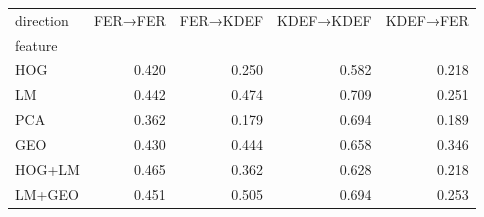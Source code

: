 \begin{tabular}{lrrrr}
\toprule
direction & FER→FER & FER→KDEF & KDEF→KDEF & KDEF→FER \\
feature &  &  &  &  \\
\midrule
HOG & 0.420 & 0.250 & 0.582 & 0.218 \\
LM & 0.442 & 0.474 & 0.709 & 0.251 \\
PCA & 0.362 & 0.179 & 0.694 & 0.189 \\
GEO & 0.430 & 0.444 & 0.658 & 0.346 \\
HOG+LM & 0.465 & 0.362 & 0.628 & 0.218 \\
LM+GEO & 0.451 & 0.505 & 0.694 & 0.253 \\
\bottomrule
\end{tabular}
